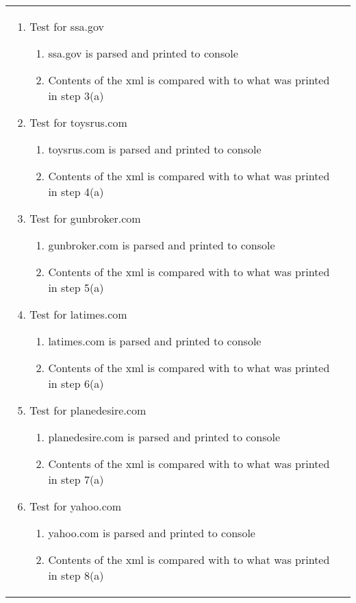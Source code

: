 \documentclass[10pt]{article}
\begin{document}
\begin{center}
\begin{longtable}{ | p{4cm} | p{10cm} | }
\begin{enumerate}
							\item Test for ssa.gov
							\begin{enumerate}
								\item ssa.gov is parsed and printed to console
								\item Contents of the xml is compared with to what was printed in step 3(a)
							\end{enumerate}

							\item Test for toysrus.com
							\begin{enumerate}
								\item toysrus.com is parsed and printed to console
								\item Contents of the xml is compared with to what was printed in step 4(a)
							\end{enumerate}

							\item Test for gunbroker.com
							\begin{enumerate}
								\item gunbroker.com is parsed and printed to console
								\item Contents of the xml is compared with to what was printed in step 5(a)
							\end{enumerate}

							\item Test for latimes.com
							\begin{enumerate}
								\item latimes.com is parsed and printed to console
								\item Contents of the xml is compared with to what was printed in step 6(a)
							\end{enumerate}

							\item Test for planedesire.com
							\begin{enumerate}
								\item planedesire.com is parsed and printed to console
								\item Contents of the xml is compared with to what was printed in step 7(a)
							\end{enumerate}

							\item  Test for yahoo.com
							\begin{enumerate}
								\item yahoo.com is parsed and printed to console
								\item Contents of the xml is compared with to what was printed in step 8(a)
							\end{enumerate}


\end{enumerate}
\end{longtable}
\end{center}
\end{document}
